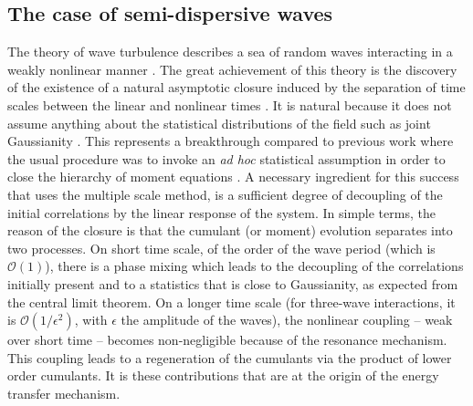 \documentclass{jpp}
\begin{document}
\subsection{The case of semi-dispersive waves}
\label{semidis}

The theory of wave turbulence describes a sea of random waves interacting in a weakly nonlinear manner \citep{GaltierCUP2022}. The great achievement of this theory is the discovery of the existence of a natural asymptotic closure induced by the separation of time scales between the linear and nonlinear times \citep{Benney1966,Benney1967}. It is natural because it does not assume anything about the statistical distributions of the field such as joint Gaussianity \citep{Newell2001}. This represents a breakthrough compared to previous work where the usual procedure was to invoke an {\it ad hoc} statistical assumption in order to close the hierarchy of moment equations \citep{Hasselmann1962}. A necessary ingredient for this success that uses the multiple scale method, is a sufficient degree of decoupling of the initial correlations by the linear response of the system. In simple terms, the reason of the closure is that the cumulant (or moment) evolution separates into two processes. On short time scale, of the order of the wave period (which is $\mathcal{O} (1)$), there is a phase mixing which leads to the decoupling of the correlations initially present and to a statistics that is close to Gaussianity, as expected from the central limit theorem. On a longer time scale (for three-wave interactions, it is $\mathcal{O} (1/\epsilon^2)$, with $\epsilon$ the amplitude of the waves), the nonlinear coupling -- weak over short time -- becomes non-negligible because of the resonance mechanism. This coupling leads to a regeneration of the cumulants via the product of lower order cumulants. It is these contributions that are at the origin of the energy transfer mechanism. 
\end{document}
